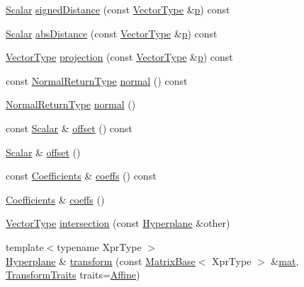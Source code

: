 \begin{DoxyCompactItemize}
\item 
\hyperlink{class_hyperplane_a7aa8093dff10cabfce189f280fb14069}{Scalar} \hyperlink{class_hyperplane_a2daf520a43be42fd98ae3779d2ef7fc9}{signed\-Distance} (const \hyperlink{class_hyperplane_ae700a24e287a31cece3618e1e1bc6385}{Vector\-Type} \&\hyperlink{glext_8h_aa5367c14d90f462230c2611b81b41d23}{p}) const 
\item 
\hyperlink{class_hyperplane_a7aa8093dff10cabfce189f280fb14069}{Scalar} \hyperlink{class_hyperplane_ad69a6e645690c995636298e896a45c36}{abs\-Distance} (const \hyperlink{class_hyperplane_ae700a24e287a31cece3618e1e1bc6385}{Vector\-Type} \&\hyperlink{glext_8h_aa5367c14d90f462230c2611b81b41d23}{p}) const 
\item 
\hyperlink{class_hyperplane_ae700a24e287a31cece3618e1e1bc6385}{Vector\-Type} \hyperlink{class_hyperplane_aa25633fe8c36b9736f3b27dd3970146e}{projection} (const \hyperlink{class_hyperplane_ae700a24e287a31cece3618e1e1bc6385}{Vector\-Type} \&\hyperlink{glext_8h_aa5367c14d90f462230c2611b81b41d23}{p}) const 
\item 
const \hyperlink{class_hyperplane_afe891d31b5136e497ed034c658659539}{Normal\-Return\-Type} \hyperlink{class_hyperplane_af15df7439581973bf971981ef77a7a99}{normal} () const 
\item 
\hyperlink{class_hyperplane_afe891d31b5136e497ed034c658659539}{Normal\-Return\-Type} \hyperlink{class_hyperplane_ad2655a6a91d919a605711470ece98a9b}{normal} ()
\item 
const \hyperlink{class_hyperplane_a7aa8093dff10cabfce189f280fb14069}{Scalar} \& \hyperlink{class_hyperplane_afb82fd06d1c5ddf991dd145bcd4336ef}{offset} () const 
\item 
\hyperlink{class_hyperplane_a7aa8093dff10cabfce189f280fb14069}{Scalar} \& \hyperlink{class_hyperplane_ae72fa4aec9273b729371d38c45634ae4}{offset} ()
\item 
const \hyperlink{class_hyperplane_ab7c2ddb9b72c5b8bbf5b754bd54b3f48}{Coefficients} \& \hyperlink{class_hyperplane_a3b376f4a3634dd2cbab89439bee716de}{coeffs} () const 
\item 
\hyperlink{class_hyperplane_ab7c2ddb9b72c5b8bbf5b754bd54b3f48}{Coefficients} \& \hyperlink{class_hyperplane_a029db90f8901be3cee4419f2068e2b5a}{coeffs} ()
\item 
\hyperlink{class_hyperplane_ae700a24e287a31cece3618e1e1bc6385}{Vector\-Type} \hyperlink{class_hyperplane_ac9177251d0e700efe53314657f640eab}{intersection} (const \hyperlink{class_hyperplane}{Hyperplane} \&other)
\item 
{\footnotesize template$<$typename Xpr\-Type $>$ }\\\hyperlink{class_hyperplane}{Hyperplane} \& \hyperlink{class_hyperplane_ae8bf9410d0c8ab664c1da042f6b4fbcc}{transform} (const \hyperlink{class_matrix_base}{Matrix\-Base}$<$ Xpr\-Type $>$ \&\hyperlink{uavobjecttemplate_8m_a16a51e808b16c46bbfd36da2e37cd123}{mat}, \hyperlink{_transform_8h_a302a826315506a7217d4b477ea78425f}{Transform\-Traits} traits=\hyperlink{_transform_8h_a302a826315506a7217d4b477ea78425fac0984f0c0fc7cdcea1c0bde170f9c925}{Affine})

\end{DoxyCompactItemize}
